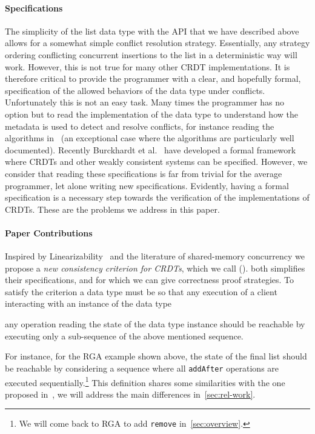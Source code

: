 \paragraph{Specifications}
The simplicity of the list data type with the API that we have
described above allows for a somewhat simple conflict resolution
strategy.
%
Essentially, any strategy ordering conflicting concurrent insertions
to the list in a deterministic way will work.
%
However, this is not true for many other CRDT implementations.
%
It is therefore critical to provide the programmer with a clear, and
hopefully formal, specification of the allowed behaviors of the data
type under conflicts.
%
Unfortunately this is not an easy task.
%
Many times the programmer has no option but to read the implementation
of the data type to understand how the metadata is used to detect and
resolve conflicts, for instance reading the algorithms
in~\cite{ShapiroPBZ11} (an exceptional case where the algorithms are
particularly well documented).
%
Recently Burckhardt et al.~\cite{BurckhardtGYZ14, Burckhardt14} have
developed a formal framework where CRDTs and other weakly
consistent systems can be specified.
%
However, we consider that reading these specifications is far from
trivial for the average programmer, let alone writing new
specifications.
%
Evidently, having a formal specification is a necessary step towards
the verification of the implementations of CRDTs.
%
These are the problems we address in this paper.

\paragraph{Paper Contributions}

Inspired by Linearizability~\cite{HerlihyW90} and the literature of
shared-memory concurrency we propose a \emph{new consistency criterion
  for CRDTs}, which we call \emph{\CRDTLin{}} (\CRDTLinshort{}).
%
\CRDTLinshort{} both simplifies their specifications, and for which we
can give correctness proof strategies.
%
To satisfy the \CRDTLinshort{} criterion a data type must be so that
any execution of a client interacting with an instance of the data
type
\begin{inparaenum}
\item {}
\item any operation reading the state of the data type instance should
  be reachable by executing only a sub-sequence of the above mentioned
  sequence.
\end{inparaenum}
For instance, for the RGA example shown above, the state of the final
list should be reachable by considering a sequence where all
\lstinline|addAfter| operations are executed sequentially.\footnote{We
  will come back to RGA to add \lstinline|remove|
  in~\autoref{sec:overview}.}
%
This definition shares some similarities with the one proposed
in~\cite{PerrinMJ14}, we will address the main differences
in~\autoref{sec:rel-work}.

